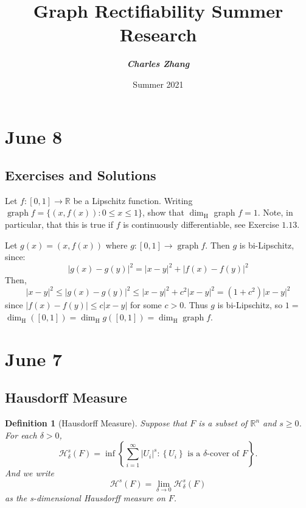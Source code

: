 \documentclass[12pt, a4paper]{article}
\title{\textbf{Graph Rectifiability Summer Research} \\ [0.5cm] \sffamily{Daily Report\\(in reverse chronological order)}}
\author{\textbf{\textit{Charles Zhang}}}
\date{Summer 2021}
\newtheorem{definition}{Definition}[subsection]
\begin{document}
\maketitle

{
    \hypersetup{linkcolor=black}
    \tableofcontents
}


\newpage
\section{June 8}
\subsection{Exercises and Solutions}
\begin{customexercise}{3.7}
    Let $f:[0,1] \rightarrow \mathbb{R}$ be a Lipschitz function. Writing $\operatorname{graph} f=\{(x, f(x)): 0 \leq x \leq 1\}$, show that $\operatorname{dim}_{\mathrm{H}}$ graph $f=1 .$ Note, in
particular, that this is true if $f$ is continuously differentiable, see Exercise $1.13 .$
\end{customexercise}
\begin{customsol}{3.7}
   Let $g(x)=(x, f(x))$ where $g:[0,1] \rightarrow \operatorname{graph} f$. Then $g$ is bi-Lipschitz, since:
$$
|g(x)-g(y)|^{2}=|x-y|^{2}+|f(x)-f(y)|^{2}
$$
Then,
$$
|x-y|^{2} \leq|g(x)-g(y)|^{2} \leq|x-y|^{2}+c^{2}|x-y|^{2}=\left(1+c^{2}\right)|x-y|^{2}
$$
since $|f(x)-f(y)| \leq c|x-y|$ for some $c>0$. Thus $g$ is bi-Lipschitz, so $1=$ $\operatorname{dim}_{\mathrm{H}}([0,1])=\operatorname{dim}_{\mathrm{H}} g([0,1])=\operatorname{dim}_{\mathrm{H}} \operatorname{graph} f$.
\end{customsol}

\newpage
\section{June 7}
\subsection{Hausdorff Measure}
\begin{definition}[Hausdorff Measure]
    Suppose that $F$ is a subset of $\mathbb{R}^n$ and $s\geq 0$. For each $\delta >0$,
    $$
    \mathcal{H}_{\delta}^{s}(F)=\inf \left\{\sum_{i=1}^{\infty}\left|U_{i}\right|^{s}:\left\{U_{i}\right\} \text { is a } \delta \text {-cover of } F\right\} .
    $$
    And we write
    $$
    \mathcal{H}^s (F) = \lim_{\delta\rightarrow 0} \mathcal{H}^s_\delta(F)
    $$
    as the s-dimensional Hausdorff measure on $F$.
\end{definition}
\end{document}
